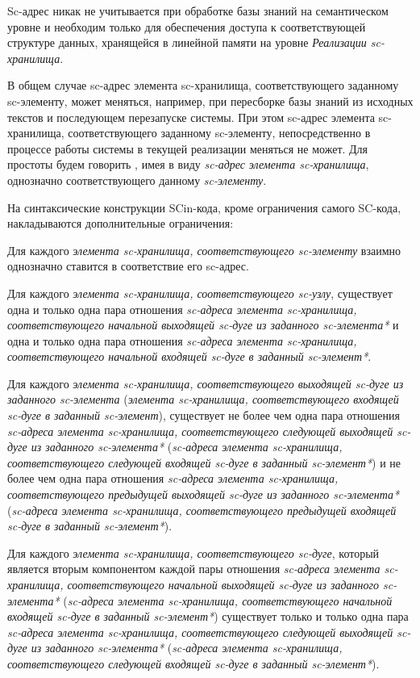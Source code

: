Sc-адрес никак не учитывается при обработке базы знаний на семантическом уровне и необходим только для обеспечения доступа к соответствующей структуре данных, хранящейся в линейной памяти на уровне \textit{Реализации sc-хранилища}.

В общем случае sc-адрес элемента sc-хранилища, соответствующего заданному sc-элементу, может меняться, например, при пересборке базы знаний из исходных текстов и последующем перезапуске системы. При этом sc-адрес элемента sc-хранилища, соответствующего заданному sc-элементу, непосредственно в процессе работы системы в текущей реализации меняться не может. Для простоты будем говорить , имея в виду \textit{sc-адрес} \textit{элемента sc-хранилища}, однозначно соответствующего данному \textit{sc-элементу}.

На синтаксические конструкции SCin-кода, кроме ограничения самого SC-кода, накладываются дополнительные ограничения:
\begin{textitemize}
    \item Для каждого \textit{элемента sc-хранилища, соответствующего sc-элементу} взаимно однозначно ставится в соответствие его sc-адрес.
    \item Для каждого \textit{элемента sc-хранилища, соответствующего sc-узлу}, существует одна и только одна пара отношения \textit{sc-адреса элемента sc-хранилища, соответствующего начальной выходящей sc-дуге из заданного sc-элемента*} и одна и только одна пара отношения \textit{sc-адреса элемента sc-хранилища, соответствующего начальной входящей sc-дуге в заданный sc-элемент*}.
    \item Для каждого \textit{элемента sc-хранилища, соответствующего выходящей sc-дуге из заданного sc-элемента} (\textit{элемента sc-хранилища, соответствующего входящей sc-дуге в заданный sc-элемент}), существует не более чем одна пара отношения \textit{sc-адреса элемента sc-хранилища, соответствующего следующей выходящей sc-дуге из заданного sc-элемента*} (\textit{sc-адреса элемента sc-хранилища, соответствующего следующей входящей sc-дуге в заданный sc-элемент*}) и не более чем одна пара отношения \textit{sc-адреса элемента sc-хранилища, соответствующего предыдущей выходящей sc-дуге из заданного sc-элемента*} (\textit{sc-адреса элемента sc-хранилища, соответствующего предыдущей входящей sc-дуге в заданный sc-элемент*}).
    \item Для каждого \textit{элемента sc-хранилища, соответствующего sc-дуге}, который является вторым компонентом каждой пары отношения \textit{sc-адреса элемента sc-хранилища, соответствующего начальной выходящей sc-дуге из заданного sc-элемента*} (\textit{sc-адреса элемента sc-хранилища, соответствующего начальной входящей sc-дуге в заданный sc-элемент*}) существует только и только одна пара \textit{sc-адреса элемента sc-хранилища, соответствующего следующей выходящей sc-дуге из заданного sc-элемента*} (\textit{sc-адреса элемента sc-хранилища, соответствующего следующей входящей sc-дуге в заданный sc-элемент*}).
\end{textitemize}

